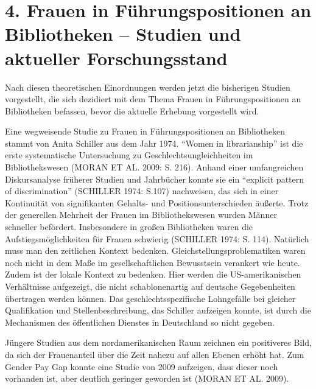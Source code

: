 \documentclass[a4paper,
fontsize=11pt,
oneside,
numbers=noperiodatend,
parskip=half-,
bibliography=totoc,
final
]{scrartcl}
\begin{document}
\hypertarget{frauen-in-fuxfchrungspositionen-an-bibliotheken-studien-und-aktueller-forschungsstand}{%
\section{4. Frauen in Führungspositionen an Bibliotheken --
Studien und aktueller
Forschungsstand}\label{frauen-in-fuxfchrungspositionen-an-bibliotheken-studien-und-aktueller-forschungsstand}}

Nach diesen theoretischen Einordnungen werden jetzt die bisherigen
Studien vorgestellt, die sich dezidiert mit dem Thema Frauen in
Führungspositionen an Bibliotheken befassen, bevor die aktuelle Erhebung
vorgestellt wird.

Eine wegweisende Studie zu Frauen in Führungspositionen an Bibliotheken
stammt von Anita Schiller aus dem Jahr 1974. \enquote{Women in
librarianship} ist die erste systematische Untersuchung zu
Geschlechtsungleichheiten im Bibliothekswesen (MORAN ET AL. 2009: S.
216). Anhand einer umfangreichen Diskursanalyse früherer Studien und
Jahrbücher konnte sie ein \enquote{explicit pattern of discrimination}
(SCHILLER 1974: S.107) nachweisen, das sich in einer Kontinuität von
signifikanten Gehalts- und Positionsunterschieden äußerte. Trotz der
generellen Mehrheit der Frauen im Bibliothekswesen wurden Männer
schneller befördert. Insbesondere in großen Bibliotheken waren die
Aufstiegsmöglichkeiten für Frauen schwierig (SCHILLER 1974: S. 114).
Natürlich muss man den zeitlichen Kontext bedenken.
Gleichstellungsproblematiken waren noch nicht in dem Maße im
gesellschaftlichen Bewusstsein verankert wie heute. Zudem ist der lokale
Kontext zu bedenken. Hier werden die US-amerikanischen Verhältnisse
aufgezeigt, die nicht schablonenartig auf deutsche Gegebenheiten
übertragen werden können. Das geschlechtsspezifische Lohngefälle bei
gleicher Qualifikation und Stellenbeschreibung, das Schiller aufzeigen
konnte, ist durch die Mechanismen des öffentlichen Dienstes in
Deutschland so nicht gegeben.

Jüngere Studien aus dem nordamerikanischen Raum zeichnen ein positiveres
Bild, da sich der Frauenanteil über die Zeit nahezu auf allen Ebenen
erhöht hat. Zum Gender Pay Gap konnte eine Studie von 2009 aufzeigen,
dass dieser noch vorhanden ist, aber deutlich geringer geworden ist (MORAN
ET AL. 2009).
\end{document}
